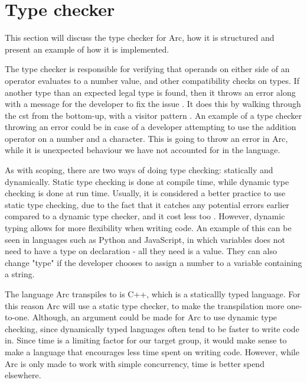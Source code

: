 \section{Type checker}\label{sec:typechecker}

This section will discuss the type checker for Arc, how it is structured and present an example of how it is implemented.

The type checker is responsible for verifying that operands on either side of an operator evaluates to a number value, and other compatibility checks on types. If another type than an expected legal type is found, then it throws an error along with a message for the developer to fix the issue \cite{Sebesta2016}. It does this by walking through the \gls{cst} from the bottom-up, with a visitor pattern \cite{Parr2014}. An example of a type checker throwing an error could be in case of a developer attempting to use the addition operator on a number and a character. This is going to throw an error in Arc, while it is unexpected behaviour we have not accounted for in the language.

As with scoping, there are two ways of doing type checking: statically and dynamically. Static type checking is done at compile time, while dynamic type checking is done at run time. Usually, it is considered a better practice to use static type checking, due to the fact that it catches any potential errors earlier compared to a dynamic type checker, and it cost less too \cite{Sebesta2016}. However, dynamic typing allows for more flexibility when writing code. An example of this can be seen in languages such as Python and JavaScript, in which variables does not need to have a type on declaration - all they need is a value. They can also change "type" if the developer chooses to assign a number to a variable containing a string.

The language Arc transpiles to is C++, which is a staticallly typed language. For this reason Arc will use a static type checker, to make the transpilation more one-to-one. Although, an argument could be made for Arc to use dynamic type checking, since dynamically typed languages often tend to be faster to write code in. Since time is a limiting factor for our target group, it would make sense to make a language that encourages less time spent on writing code. However, while Arc is only made to work with simple concurrency, time is better spend elsewhere.




